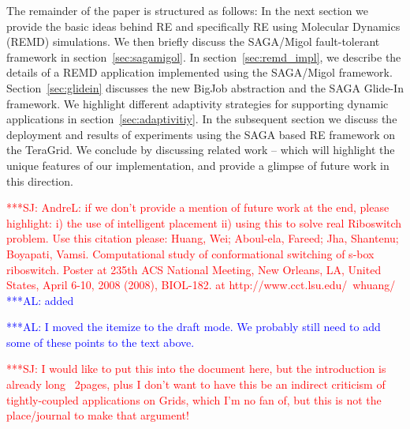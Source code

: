 \documentclass{rspublic}
\newif\ifdraft
\newcommand{\alnote}[1]{ {\textcolor{blue} { ***AL: #1 }}}
\newcommand{\jhanote}[1]{ {\textcolor{red} { ***SJ: #1 }}}
\newcommand{\alnote}[1]{}
\newcommand{\jhanote}[1]{}
\begin{document}
The remainder of the paper is structured as follows: In the next
section we provide the basic ideas behind RE and specifically
RE using Molecular Dynamics (REMD) simulations.  We then
briefly discuss the SAGA/Migol fault-tolerant framework in
section~\ref{sec:sagamigol}.  In section~\ref{sec:remd_impl}, we
describe the details of a REMD application implemented using the
SAGA/Mi\-gol framework. Section~\ref{sec:glidein} discusses the new
BigJob abstraction and the SAGA Glide-In framework.  We highlight
different adaptivity strategies for supporting dynamic applications in
section~\ref{sec:adaptivitiy}.  In the subsequent section we discuss
the deployment and results of experiments using the SAGA based
RE framework on the TeraGrid.  We conclude by discussing
related work -- which will highlight the unique features
of our implementation, and provide a glimpse of future work
in this direction.

\jhanote{AndreL: if we don't provide a mention of future work at the
  end, please highlight: i) the use of intelligent placement ii)
  using this to solve real Riboswitch problem. Use this citation
  please: Huang, Wei; Aboul-ela, Fareed; Jha, Shantenu; Boyapati,
  Vamsi. Computational study of conformational switching of s-box
  riboswitch. Poster at 235th ACS National Meeting, New Orleans, LA,
  United States, April 6-10, 2008 (2008), BIOL-182. at
  http://www.cct.lsu.edu/~whuang/}       
\alnote{added}

\ifdraft \alnote{I moved the itemize to the draft mode. We probably
  still need to add some of these points to the text above.}

\jhanote{I would like to put this into the document here, but the
  introduction is already long ~2pages, plus I don't want to have this
  be an indirect criticism of tightly-coupled applications on Grids,
  which I'm no fan of, but this is not the place/journal to make that
  argument!}
\end{document}
